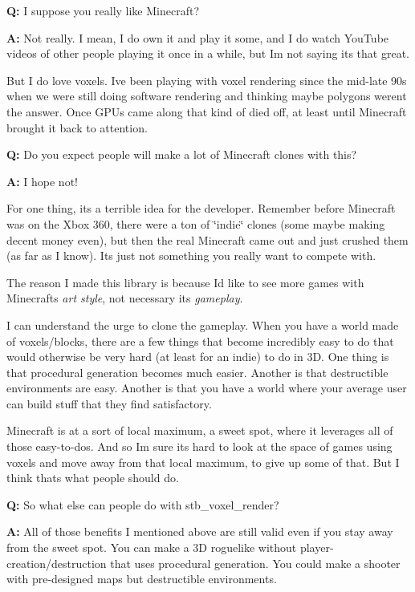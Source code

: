 {\bfseries{Q\+:}} I suppose you really like Minecraft?

{\bfseries{A\+:}} Not really. I mean, I do own it and play it some, and I do watch You\+Tube videos of other people playing it once in a while, but I\textquotesingle{}m not saying it\textquotesingle{}s that great.

But I do love voxels. I\textquotesingle{}ve been playing with voxel rendering since the mid-\/late 90\textquotesingle{}s when we were still doing software rendering and thinking maybe polygons weren\textquotesingle{}t the answer. Once GPUs came along that kind of died off, at least until Minecraft brought it back to attention.

{\bfseries{Q\+:}} Do you expect people will make a lot of Minecraft clones with this?

{\bfseries{A\+:}} I hope not!

For one thing, it\textquotesingle{}s a terrible idea for the developer. Remember before Minecraft was on the Xbox 360, there were a ton of \char`\"{}indie\char`\"{} clones (some maybe making decent money even), but then the real Minecraft came out and just crushed them (as far as I know). It\textquotesingle{}s just not something you really want to compete with.

The reason I made this library is because I\textquotesingle{}d like to see more games with Minecraft\textquotesingle{}s {\itshape art style}, not necessary its {\itshape gameplay}.

I can understand the urge to clone the gameplay. When you have a world made of voxels/blocks, there are a few things that become incredibly easy to do that would otherwise be very hard (at least for an indie) to do in 3D. One thing is that procedural generation becomes much easier. Another is that destructible environments are easy. Another is that you have a world where your average user can build stuff that they find satisfactory.

Minecraft is at a sort of local maximum, a sweet spot, where it leverages all of those easy-\/to-\/dos. And so I\textquotesingle{}m sure it\textquotesingle{}s hard to look at the space of \textquotesingle{}games using voxels\textquotesingle{} and move away from that local maximum, to give up some of that. But I think that\textquotesingle{}s what people should do.

{\bfseries{Q\+:}} So what else can people do with stb\+\_\+voxel\+\_\+render?

{\bfseries{A\+:}} All of those benefits I mentioned above are still valid even if you stay away from the sweet spot. You can make a 3D roguelike without player-\/creation/destruction that uses procedural generation. You could make a shooter with pre-\/designed maps but destructible environments.

